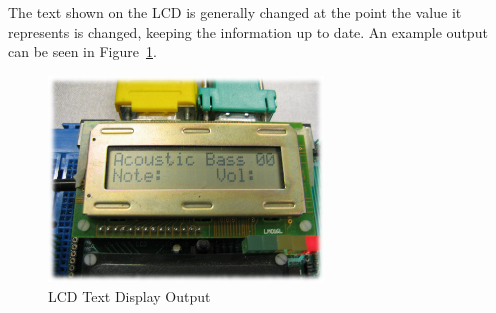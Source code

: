 The text shown on the LCD is generally changed at the point the value it represents is changed, 
keeping the information up to date.  An example output can be seen in Figure~\ref{fig:lcd}.

\begin{figure}[htb]
\centering
\includegraphics[width=0.65\textwidth]{images/lcd}
\caption{LCD Text Display Output}\label{fig:lcd}
\end{figure}
